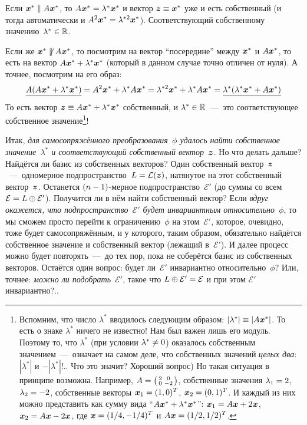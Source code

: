 \documentclass[a4paper,12pt]{article}
\theoremstyle{remark}
\begin{document}
  Если $\bds x^* \hm\parallel A \bds x^*$, то $A \bds x^* \hm= \lambda^* \bds x^*$ и вектор $\bds z \hm\equiv \bds x^*$ уже и есть собственный (и тогда автоматически и $A^2 \bds x^* \hm= \lambda^{*2} \bds x^*$).
  Соответствующий собственному значению~$\lambda^* \hm\in \RR$.
  
  Если же $\bds x^* \hm{\not\parallel} A \bds x^*$, то посмотрим на вектор ``посередине'' между $\boldsymbol x^*$ и $A \boldsymbol x^*$, то есть на вектор $A \bds x^* \hm+ \lambda^* \bds x^*$ (который в данном случае точно отличен от нуля).
  А точнее, посмотрим на его образ:
  \[
    \underline{A (A \boldsymbol x^* + \lambda^* \boldsymbol x^*)} = A^2 \boldsymbol x^* + \lambda^* A \boldsymbol x^* = \lambda^{*2} \boldsymbol x^* + \lambda^* A \boldsymbol x^* = \underline{\lambda^* (\lambda^* \boldsymbol x^* + A \boldsymbol x^*)}
  \]
  То есть вектор $\bds z \hm\equiv A \bds x^* \hm+ \lambda^* \bds x^*$ собственный, и $\lambda^* \hm\in \RR$~---~это соответствующее собственное значение\footnote{Вспомним, что число $\lambda^*$ вводилось следующим образом: $|\lambda^*| \hm\equiv |A \bds x^*|$. То есть о знаке $\lambda^*$ ничего не известно! Нам был важен лишь его модуль. Поэтому то, что $\lambda^*$ (при условии $\lambda^* \hm{\not=} 0$) оказалось собственным значением~---~означает на самом деле, что собственных значений \emph{целых два}: $|\lambda^*|$ и $-|\lambda^*|$!.. Что это значит? Хороший вопрос) Но такая ситуация в принципе возможна. Например, $A \hm= \left(\begin{smallmatrix}2 & 0 \\ 0 & -2\end{smallmatrix}\right)$, собственные значения $\lambda_1 \hm= 2$, $\lambda_2 \hm= -2$, собственные векторы $\bds x_1 \hm= (1, 0)^T$, $\bds x_2 \hm= (0, 1)^T$. И каждый из них можно представить как сумму вида ``$A \bds x^* \hm+ \lambda^* \bds x^*$'': $\bds x_1 \hm= A \bds x \hm+ 2 \bds x$, $\bds x_2 \hm= A \bds x \hm- 2 \bds x$, где $\bds x \hm= (1/4, -1/4)^T$ и $A \bds x \hm= (1/2, 1/2)^T$.}!
  
  Итак, \emph{для самосопряжённого преобразования~$\phi$ удалось найти собственное значение~$\lambda^*$ и соответствующий собственный вектор~$\boldsymbol z$}.
  Но что делать дальше?
  Найдётся ли базис из собственных векторов?
  Один собственный вектор~$\boldsymbol z$~---~одномерное подпространство~$L \hm= \mathcal L(\bds z)$, натянутое на этот собственный вектор~$\boldsymbol z$.
  Останется $(n \hm- 1)$-мерное подпространство~$\mathcal E'$ (до суммы со всем~$\mathcal E \hm= L \hm\oplus \mathcal E'$).
  Получится ли в нём найти собственный вектор?
  Если \emph{вдруг окажется, что подпространство~$\mathcal E'$ будет инвариантным относительно~$\phi$}, то мы сможем просто перейти к ограничению~$\phi$ на этом~$\mathcal E'$, которое, очевидно, тоже будет самосопряжённым, и у которого, таким образом, обязательно найдётся собственное значение и собственный вектор (лежащий в~$\mathcal E'$).
  И далее процесс можно будет повторять~---~до тех пор, пока не соберётся базис из собственных векторов.
  Остаётся один вопрос: будет ли~$\mathcal E'$ инвариантно относительно~$\phi$?
  Или, точнее: \emph{можно ли подобрать~$\mathcal E'$}, такое что $L \hm\oplus \mathcal E' \hm= \mathcal E$ и при этом $\mathcal E'$ инвариантно?..
  
\end{document}
